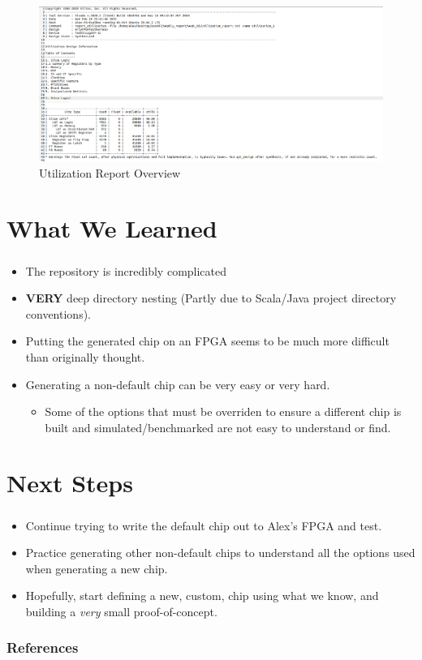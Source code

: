 \documentclass{../weeklyslides}
\begin{document}
\begin{frame}
	\begin{figure}[H]
		\centering
		\includegraphics[width=0.7\linewidth]{Report_Overview}
		\caption{Utilization Report Overview}
		\label{fig:reportoverview}
	\end{figure}

\end{frame}

\section{What We Learned}\label{sec:What_We_Learned}
\begin{frame}
  \frametitle{}
  \begin{itemize}
  \item The repository is incredibly complicated
  \item \textbf{VERY} deep directory nesting (Partly due to Scala/Java project directory conventions).
  \item Putting the generated chip on an FPGA seems to be much more difficult than originally thought.
  \item Generating a non-default chip can be very easy or very hard.
    \begin{itemize}
    \item Some of the options that must be overriden to ensure a different chip is built and simulated/benchmarked are not easy to understand or find.
    \end{itemize}
  \end{itemize}
\end{frame}


\section{Next Steps}\label{sec:Next_Steps}
\begin{frame}
  \frametitle{}
  \begin{itemize}
  \item Continue trying to write the default chip out to Alex's FPGA and test.
  \item Practice generating other non-default chips to understand all the options used when generating a new chip.
  \item Hopefully, start defining a new, custom, chip using what we know, and building a \emph{very} small proof-of-concept.
  \end{itemize}
\end{frame}

\begin{frame}
  \frametitle{References}
  \printbibliography[heading=bibintoc]{}
\end{frame}
\end{document}
